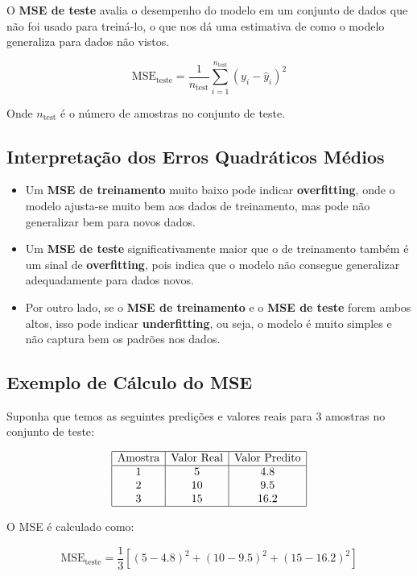 \documentclass{sciposter}
\begin{document}
\begin{multicols}{3}
O \textbf{MSE de teste} avalia o desempenho do modelo em um conjunto de dados que não foi usado para treiná-lo, o que nos dá uma estimativa de como o modelo generaliza para dados não vistos.

\[
\text{MSE}_{\text{teste}} = \frac{1}{n_{\text{test}}} \sum_{i=1}^{n_{\text{test}}} (y_i - \hat{y}_i)^2
\]

Onde $n_{\text{test}}$ é o número de amostras no conjunto de teste.

\subsection{Interpretação dos Erros Quadráticos Médios}

\begin{itemize}
    \item Um \textbf{MSE de treinamento} muito baixo pode indicar \textbf{overfitting}, onde o modelo ajusta-se muito bem aos dados de treinamento, mas pode não generalizar bem para novos dados.
    \item Um \textbf{MSE de teste} significativamente maior que o de treinamento também é um sinal de \textbf{overfitting}, pois indica que o modelo não consegue generalizar adequadamente para dados novos.
    \item Por outro lado, se o \textbf{MSE de treinamento} e o \textbf{MSE de teste} forem ambos altos, isso pode indicar \textbf{underfitting}, ou seja, o modelo é muito simples e não captura bem os padrões nos dados.
\end{itemize}

\subsection{Exemplo de Cálculo do MSE}

Suponha que temos as seguintes predições e valores reais para 3 amostras no conjunto de teste:

\[
\begin{array}{|c|c|c|}
\hline
\text{Amostra} & \text{Valor Real} & \text{Valor Predito} \\
\hline
1 & 5 & 4.8 \\
2 & 10 & 9.5 \\
3 & 15 & 16.2 \\
\hline
\end{array}
\]

O MSE é calculado como:

\[
\text{MSE}_{\text{teste}} = \frac{1}{3} \left[(5 - 4.8)^2 + (10 - 9.5)^2 + (15 - 16.2)^2 \right]
\]


\end{multicols}
\end{document}

